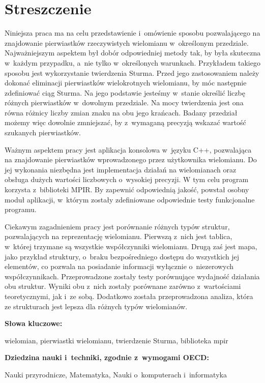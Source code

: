 \chapter*{Streszczenie}
\indent
Niniejsza praca ma na celu przedstawienie i~omówienie sposobu pozwalającego na znajdowanie pierwiastków rzeczywistych wielomianu w~określonym przedziale. Najważniejszym aspektem był dobór odpowiedniej metody tak, by była skuteczna w~każdym przypadku, a~nie tylko w~określonych warunkach. Przykładem takiego sposobu jest wykorzystanie twierdzenia Sturma. Przed jego zastosowaniem należy dokonać eliminacji pierwiastków wielokrotnych wielomianu, by móc następnie zdefiniować ciąg Sturma. Na jego podstawie jesteśmy w~stanie określić liczbę różnych pierwiastków w~dowolnym przedziale.  Na mocy twierdzenia jest ona równa różnicy liczby zmian znaku na obu jego krańcach. Badany przedział możemy więc dowolnie zmniejszać, by z~wymaganą precyzją wskazać wartość szukanych pierwiastków.

Ważnym aspektem pracy jest aplikacja konsolowa w~języku C++, pozwalająca na znajdowanie pierwiastków wprowadzonego przez użytkownika wielomianu. Do jej wykonania niezbędna jest implementacja działań na wielomianach oraz obsługa dużych wartości liczbowych o~wysokiej precyzji. W tym celu program korzysta z~biblioteki MPIR. By zapewnić odpowiednią jakość, powstał osobny moduł aplikacji, w~którym zostały zdefiniowane odpowiednie testy funkcjonalne programu.

Ciekawym zagadnieniem pracy jest porównanie różnych typów struktur, pozwalających na reprezentację wielomianu. Pierwszą z~nich jest tablica, w~której trzymane są wszystkie współczynniki wielomianu. Drugą zaś jest mapa, jako przykład struktury, o~braku bezpośredniego dostępu do wszystkich jej elementów, co pozwala na posiadanie informacji wyłącznie o~niezerowych współczynnikach. Przeprowadzone zostały testy porównujące wydajność działania obu struktur. Wyniki obu z~nich zostały porównane zarówno z~wartościami teoretycznymi, jak i~ze sobą. Dodatkowo została przeprowadzona analiza, która ze strukturach jest lepsza dla różnych typów wielomianów.

\vspace{12pt}
\noindent\textbf{Słowa kluczowe:}

wielomian, pierwiastki wielomianu, twierdzenie Sturma, biblioteka mpir

\vspace{12pt}
\noindent\textbf{Dziedzina nauki i~techniki, zgodnie z~wymogami OECD:}

Nauki przyrodnicze, Matematyka, Nauki o~komputerach i~informatyka
